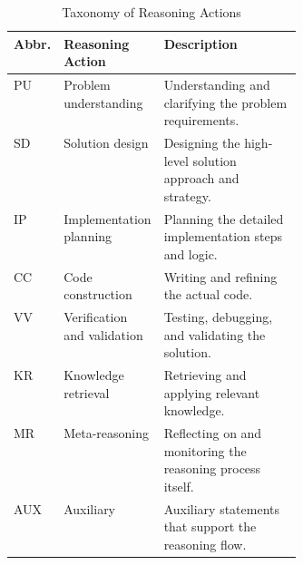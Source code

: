 \begin{table}[t]
\centering
\caption{Taxonomy of Reasoning Actions}
\label{tab:taxonomy}
\papertablestyle
\begin{tabularx}{\linewidth}{>{\centering\arraybackslash}p{0.08\linewidth}>{\raggedright\arraybackslash}p{0.29\linewidth}>{\raggedright\arraybackslash}X}
\toprule
Abbr. & Reasoning Action & Description \\
\midrule
PU  & Problem understanding & Understanding and clarifying the problem requirements. \\
\rowcolor{blue!5}
SD  & Solution design & Designing the high-level solution approach and strategy. \\
IP  & Implementation planning & Planning the detailed implementation steps and logic. \\
\rowcolor{blue!5}
CC  & Code construction & Writing and refining the actual code. \\
VV  & Verification and validation & Testing, debugging, and validating the solution. \\
\rowcolor{blue!5}
KR  & Knowledge retrieval & Retrieving and applying relevant knowledge. \\
MR  & Meta-reasoning & Reflecting on and monitoring the reasoning process itself. \\
\rowcolor{blue!5}
AUX & Auxiliary & Auxiliary statements that support the reasoning flow. \\
\bottomrule
\end{tabularx}
\end{table}
